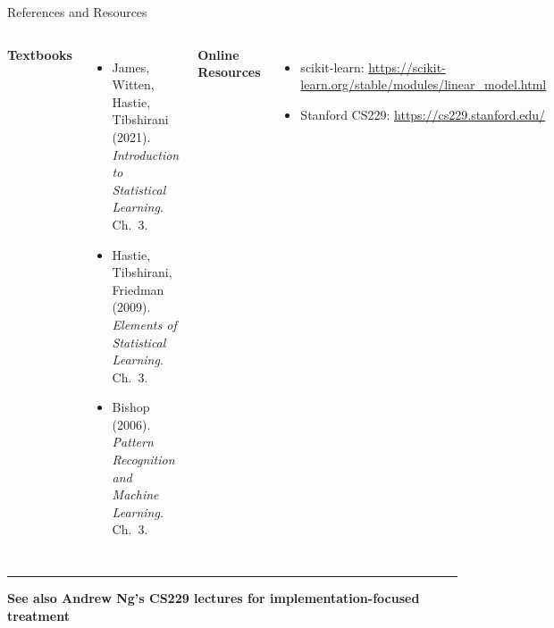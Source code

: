 \documentclass[8pt,aspectratio=169]{beamer}
\newcommand{\bottomnote}[1]{%
\vfill
\vspace{-2mm}
\textcolor{mllavender2}{\rule{\textwidth}{0.4pt}}
\vspace{1mm}
\footnotesize
\textbf{#1}
}
\begin{document}
\begin{frame}[t]{References and Resources}
\begin{columns}[T]
\textbf{Textbooks}
\footnotesize
\begin{itemize}
  \item James, Witten, Hastie, Tibshirani (2021). \textit{Introduction to Statistical Learning}. Ch.~3.
  \item Hastie, Tibshirani, Friedman (2009). \textit{Elements of Statistical Learning}. Ch.~3.
  \item Bishop (2006). \textit{Pattern Recognition and Machine Learning}. Ch.~3.
\end{itemize}

\textbf{Online Resources}
\footnotesize
\begin{itemize}
  \item scikit-learn: \url{https://scikit-learn.org/stable/modules/linear_model.html}
  \item Stanford CS229: \url{https://cs229.stanford.edu/}
\end{itemize}
\end{columns}

\bottomnote{See also Andrew Ng's CS229 lectures for implementation-focused treatment}
\end{frame}
\end{document}
